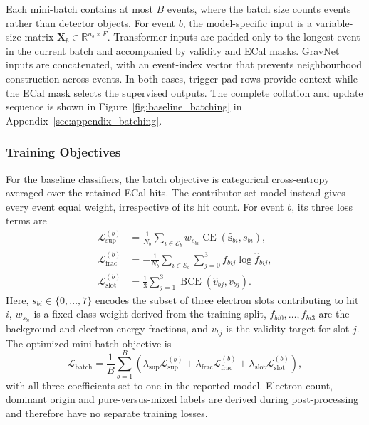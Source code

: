 Each mini-batch contains at most \(B\) events, where the batch size counts
events rather than detector objects. For event \(b\), the model-specific input
is a variable-size matrix
\(\mathbf{X}_b\in\mathbb{R}^{n_b\times F}\). Transformer inputs are padded
only to the longest event in the current batch and accompanied by validity and
ECal masks. GravNet inputs are concatenated, with an event-index vector that
prevents neighbourhood construction across events. In both cases, trigger-pad
rows provide context while the ECal mask selects the supervised outputs. The
complete collation and update sequence is shown in
Figure~\ref{fig:baseline_batching} in
Appendix~\ref{sec:appendix_batching}.

\subsubsection{Training Objectives}
\label{sec:method_training}

For the baseline classifiers, the batch objective is categorical
cross-entropy averaged over the retained ECal hits. The contributor-set model
instead gives every event equal
weight, irrespective of its hit count. For event \(b\), its three loss terms
are
\begin{align}
    \mathcal{L}_{\mathrm{sup}}^{(b)}
    &=
    \frac{1}{N_b}\sum_{i\in\mathcal{E}_b}
    w_{s_{bi}}\operatorname{CE}
    \!\left(\widehat{\boldsymbol{s}}_{bi},s_{bi}\right), \\
    \mathcal{L}_{\mathrm{frac}}^{(b)}
    &=
    -\frac{1}{N_b}\sum_{i\in\mathcal{E}_b}
    \sum_{j=0}^{3} f_{bij}\log \widehat f_{bij}, \\
    \mathcal{L}_{\mathrm{slot}}^{(b)}
    &=
    \frac{1}{3}\sum_{j=1}^{3}
    \operatorname{BCE}\!\left(\widehat v_{bj},v_{bj}\right).
\end{align}
Here, \(s_{bi}\in\{0,\ldots,7\}\) encodes the subset of three electron slots
contributing to hit \(i\), \(w_{s_{bi}}\) is a fixed class weight derived from
the training split, \(f_{bi0},\ldots,f_{bi3}\) are the background and
electron energy fractions, and \(v_{bj}\) is the validity target for slot
\(j\). The optimized mini-batch objective is
\begin{equation}
    \mathcal{L}_{\mathrm{batch}}
    =
    \frac{1}{B}\sum_{b=1}^{B}
    \left(
    \lambda_{\mathrm{sup}}\mathcal{L}_{\mathrm{sup}}^{(b)}
    +\lambda_{\mathrm{frac}}\mathcal{L}_{\mathrm{frac}}^{(b)}
    +\lambda_{\mathrm{slot}}\mathcal{L}_{\mathrm{slot}}^{(b)}
    \right),
\end{equation}
with all three coefficients set to one in the reported model. Electron count,
dominant origin and pure-versus-mixed labels are derived during
post-processing and therefore have no separate training losses.


